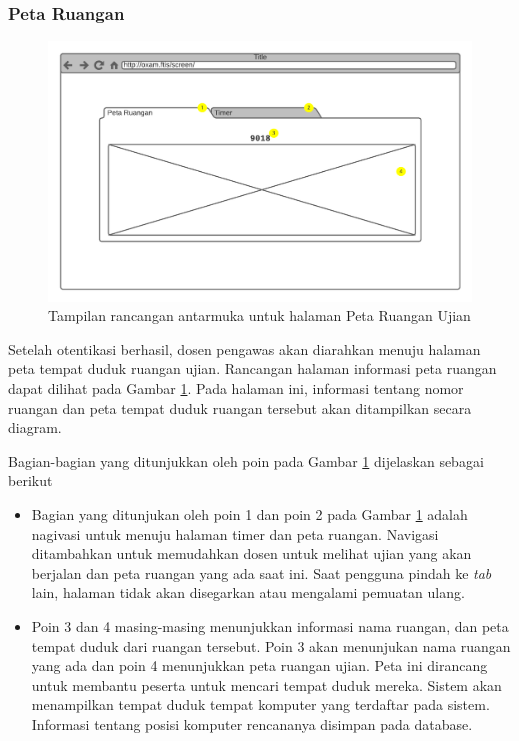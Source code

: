 \subsubsection{Peta Ruangan}
    \begin{figure}
        \centering
        \includegraphics[width=0.7\paperwidth]{Gambar/mockups/Mockup--DosenPengawas - Seatmap.pdf}
        \caption{Tampilan rancangan antarmuka untuk halaman Peta Ruangan Ujian}
        \label{fig:mockup_dosen_seatmap}
    \end{figure}
    Setelah otentikasi berhasil, dosen pengawas akan diarahkan menuju halaman peta tempat duduk ruangan
    ujian. Rancangan halaman informasi peta ruangan dapat dilihat pada Gambar 
    \ref{fig:mockup_dosen_seatmap}. Pada halaman ini, informasi tentang nomor ruangan dan peta
    tempat duduk ruangan tersebut akan ditampilkan secara diagram.
    
    Bagian-bagian yang ditunjukkan oleh poin pada Gambar \ref{fig:mockup_dosen_seatmap} dijelaskan sebagai
    berikut
    \begin{itemize}
        \item Bagian yang ditunjukan oleh poin 1 dan poin 2 pada Gambar \ref{fig:mockup_dosen_seatmap}
            adalah nagivasi untuk menuju halaman timer dan peta ruangan. Navigasi ditambahkan untuk 
            memudahkan dosen untuk melihat ujian yang akan berjalan dan peta ruangan yang ada saat ini.
            Saat pengguna pindah ke \textit{tab} lain, halaman tidak akan disegarkan atau mengalami pemuatan
            ulang. 
            
        \item Poin 3 dan 4 masing-masing menunjukkan informasi nama ruangan, dan peta tempat duduk dari
            ruangan tersebut. Poin 3 akan menunjukan nama ruangan yang ada dan poin
            4 menunjukkan peta ruangan ujian. Peta ini dirancang untuk membantu peserta untuk mencari
            tempat duduk mereka. Sistem akan menampilkan tempat duduk tempat komputer yang terdaftar
            pada sistem. Informasi tentang posisi komputer rencananya disimpan pada database.
    \end{itemize}
